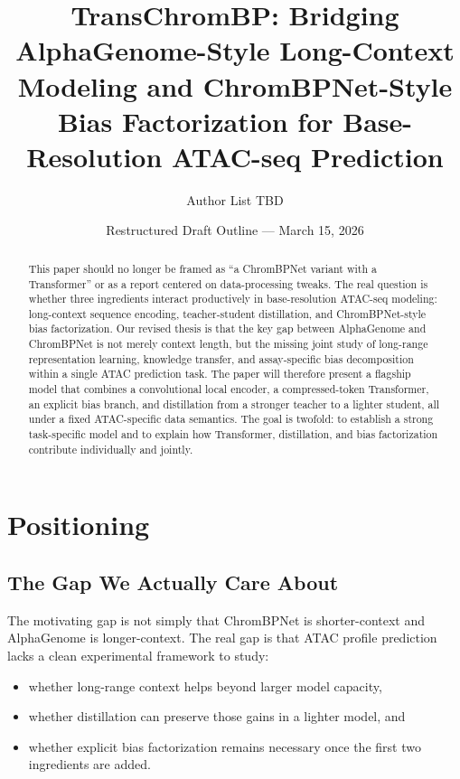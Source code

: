 \documentclass[11pt]{article}
\title{TransChromBP: Bridging AlphaGenome-Style Long-Context Modeling and ChromBPNet-Style Bias Factorization for Base-Resolution ATAC-seq Prediction}
\author{Author List TBD}
\date{Restructured Draft Outline --- March 15, 2026}
\begin{document}
\maketitle

\begin{abstract}
This paper should no longer be framed as ``a ChromBPNet variant with a
Transformer'' or as a report centered on data-processing tweaks. The real
question is whether three ingredients interact productively in base-resolution
ATAC-seq modeling: long-context sequence encoding, teacher-student
distillation, and ChromBPNet-style bias factorization. Our revised thesis is
that the key gap between AlphaGenome and ChromBPNet is not merely context
length, but the missing joint study of long-range representation learning,
knowledge transfer, and assay-specific bias decomposition within a single ATAC
prediction task. The paper will therefore present a flagship model that combines
a convolutional local encoder, a compressed-token Transformer, an explicit bias
branch, and distillation from a stronger teacher to a lighter student, all
under a fixed ATAC-specific data semantics. The goal is twofold: to establish a
strong task-specific model and to explain how Transformer, distillation, and
bias factorization contribute individually and jointly.
\end{abstract}

\tableofcontents

\section{Positioning}

\subsection{The Gap We Actually Care About}
The motivating gap is not simply that ChromBPNet is shorter-context and
AlphaGenome is longer-context. The real gap is that ATAC profile prediction
lacks a clean experimental framework to study:
\begin{itemize}[leftmargin=2em]
  \item whether long-range context helps beyond larger model capacity,
  \item whether distillation can preserve those gains in a lighter model, and
  \item whether explicit bias factorization remains necessary once the first two
  ingredients are added.
\end{itemize}
\end{document}
